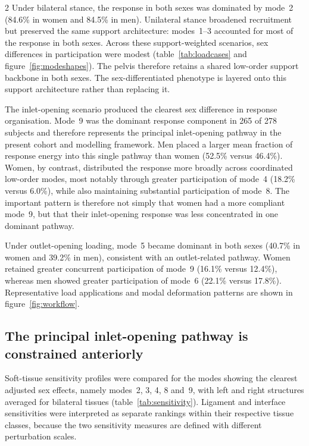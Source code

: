 \documentclass[openacc]{rsproca_new}
\begin{document}
\begin{multicols}{2}
Under bilateral stance, the response in both sexes was dominated by mode~2 (84.6\% in women and 84.5\% in men). Unilateral stance broadened recruitment but preserved the same support architecture: modes~1--3 accounted for most of the response in both sexes. Across these support-weighted scenarios, sex differences in participation were modest (table~\ref{tab:loadcases} and figure~\ref{fig:modeshapes}). The pelvis therefore retains a shared low-order support backbone in both sexes. The sex-differentiated phenotype is layered onto this support architecture rather than replacing it.

The inlet-opening scenario produced the clearest sex difference in response organisation. Mode~9 was the dominant response component in 265 of 278 subjects and therefore represents the principal inlet-opening pathway in the present cohort and modelling framework. Men placed a larger mean fraction of response energy into this single pathway than women (52.5\% versus 46.4\%). Women, by contrast, distributed the response more broadly across coordinated low-order modes, most notably through greater participation of mode~4 (18.2\% versus 6.0\%), while also maintaining substantial participation of mode~8. The important pattern is therefore not simply that women had a more compliant mode~9, but that their inlet-opening response was less concentrated in one dominant pathway.

Under outlet-opening loading, mode~5 became dominant in both sexes (40.7\% in women and 39.2\% in men), consistent with an outlet-related pathway. Women retained greater concurrent participation of mode~9 (16.1\% versus 12.4\%), whereas men showed greater participation of mode~6 (22.1\% versus 17.8\%). Representative load applications and modal deformation patterns are shown in figure~\ref{fig:workflow}.

\subsection{The principal inlet-opening pathway is constrained anteriorly}

Soft-tissue sensitivity profiles were compared for the modes showing the clearest adjusted sex effects, namely modes~2, 3, 4, 8 and~9, with left and right structures averaged for bilateral tissues (table~\ref{tab:sensitivity}). Ligament and interface sensitivities were interpreted as separate rankings within their respective tissue classes, because the two sensitivity measures are defined with different perturbation scales.


\end{multicols}
\end{document}
